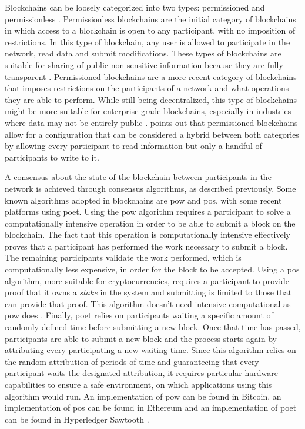 Blockchains can be loosely categorized into two types: permissioned and permissionless \cite{pilkington_blockchain_2016, yaga_blockchain_2018}. Permissionless blockchains are the initial category of blockchains in which access to a blockchain is open to any participant, with no imposition of restrictions. In this type of blockchain, any user is allowed to participate in the network, read data and submit modifications. These types of blockchains are suitable for sharing of public non-sensitive information because they are fully transparent \cite{yaga_blockchain_2018}. Permissioned blockchains are a more recent category of blockchains that imposes restrictions on the participants of a network and what operations they are able to perform. While still being decentralized, this type of blockchains might be more suitable for enterprise-grade blockchains, especially in industries where data may not be entirely public \cite{yaga_blockchain_2018}. \citeauthor{pilkington_blockchain_2016} \cite{pilkington_blockchain_2016} points out that permissioned blockchains allow for a configuration that can be considered a hybrid between both categories by allowing every participant to read information but only a handful of participants to write to it.

A consensus about the state of the blockchain between participants in the network is achieved through consensus algorithms, as described previously. Some known algorithms adopted in blockchains are \gls{pow} and \gls{pos}, with some recent platforms using \gls{poet}. Using the \gls{pow} algorithm requires a participant to solve a computationally intensive operation\cite{nakamoto_bitcoin:_2008, yaga_blockchain_2018} in order to be able to submit a block on the blockchain. The fact that this operation is computationally intensive effectively proves that a participant has performed the work necessary to submit a block. The remaining participants validate the work performed, which is computationally less expensive, in order for the block to be accepted. Using a \gls{pos} algorithm, more suitable for cryptocurrencies, requires a participant to provide proof that it owns a \emph{stake} in the system and submitting is limited to those that can provide that proof. This algorithm doesn't need intensive computational as \gls{pow} does \cite{yaga_blockchain_2018}. Finally, \gls{poet} relies on participants waiting a specific amount of randomly defined time before submitting a new block. Once that time has passed, participants are able to submit a new block and the process starts again by attributing every participating a new waiting time. Since this algorithm relies on the random attribution of periods of time and guaranteeing that every participant waits the designated attribution, it requires particular hardware capabilities to ensure a safe environment, on which applications using this algorithm would run. An implementation of \gls{pow} can be found in Bitcoin, an implementation of \gls{pos} can be found in Ethereum and an implementation of \gls{poet} can be found in Hyperledger Sawtooth \cite{yaga_blockchain_2018}.

